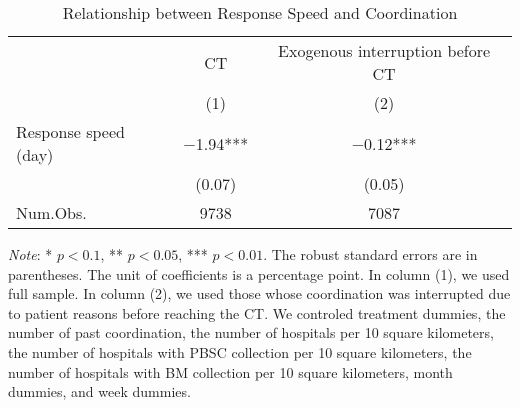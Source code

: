 \documentclass[12pt, a4paper]{article}
\begin{document}
\begin{table}[H]

\caption{\label{tab:response-speed-CT}Relationship between Response Speed and Coordination}
\centering
\fontsize{9}{11}\selectfont
\begin{threeparttable}
\begin{tabular}[t]{lcc}
\toprule
\multicolumn{1}{c}{ } & \multicolumn{1}{c}{CT} & \multicolumn{1}{c}{Exogenous interruption before CT} \\
\cmidrule(l{3pt}r{3pt}){2-2} \cmidrule(l{3pt}r{3pt}){3-3}
  & (1) & (2)\\
\midrule
Response speed (day) & \num{-1.94}*** & \num{-0.12}***\\
 & (\num{0.07}) & (\num{0.05})\\
\midrule
Num.Obs. & \num{9738} & \num{7087}\\
\bottomrule
\end{tabular}
\begin{tablenotes}
\item \emph{Note}: * $p < 0.1$, ** $p < 0.05$, *** $p < 0.01$. The robust standard errors are in parentheses. The unit of coefficients is a percentage point. In column (1), we used full sample. In column (2), we used those whose coordination was interrupted due to patient reasons before reaching the CT. We controled treatment dummies, the number of past coordination, the number of hospitals per 10 square kilometers, the number of hospitals with PBSC collection per 10 square kilometers, the number of hospitals with BM collection per 10 square kilometers, month dummies, and week dummies.
\end{tablenotes}
\end{threeparttable}
\end{table}
\end{document}
